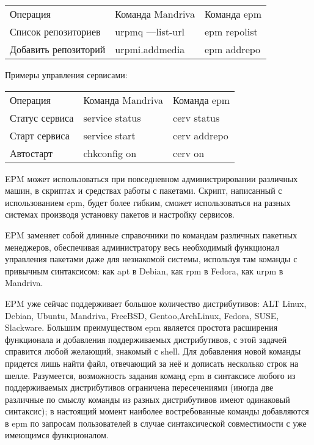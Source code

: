 \documentclass[10pt, a5paper]{article}
\begin{document}
  \begin{tabular}{ l l l }
    Операция & Команда Mandriva & Команда epm \\
    Список репозиториев & urpmq ---list-url & epm repolist \\
    Добавить репозиторий & urpmi.addmedia & epm addrepo \\
  \end{tabular}

Примеры управления сервисами:

  \begin{tabular}{ l l l }
    Операция & Команда Mandriva & Команда epm \\
    Статус сервиса & service status & cerv status \\
    Старт сервиса & service start & cerv addrepo \\
    Автостарт & chkconfig on & cerv on \\
  \end{tabular}

EPM может использоваться при повседневном администрировании различных машин, в скриптах и средствах работы с пакетами. Скрипт, написанный с использованием epm, будет более гибким, сможет использоваться на разных системах производя установку пакетов и настройку сервисов.

EPM заменяет собой длинные справочники по командам различных пакетных менеджеров, обеспечивая администратору весь необходимый функционал управления пакетами даже для незнакомой системы, используя там команды с привычным синтаксисом: как apt в Debian, как rpm в Fedora, как urpm в Mandriva.

EPM уже сейчас поддерживает большое количество дистрибутивов: ALT Linux, Debian, Ubuntu, Mandriva, FreeBSD, Gentoo,\linebreak ArchLinux, Fedora, SUSE, Slackware. Большим преимуществом epm является простота расширения функционала и добавления поддерживаемых  дистрибутивов, с этой задачей справится любой желающий, знакомый с shell. Для добавления новой команды придется лишь найти файл, отвечающий за неё и дописать несколько строк на шелле.
Разумеется, возможность задания команд epm в синтаксисе любого из поддерживаемых дистрибутивов ограничена пересечениями (иногда две различные по смыслу команды из разных дистрибутивов имеют одинаковый синтаксис); в настоящий момент наиболее востребованные команды добавляются в epm по запросам пользователей в случае синтаксической совместимости с уже имеющимся функционалом.
\end{document}
